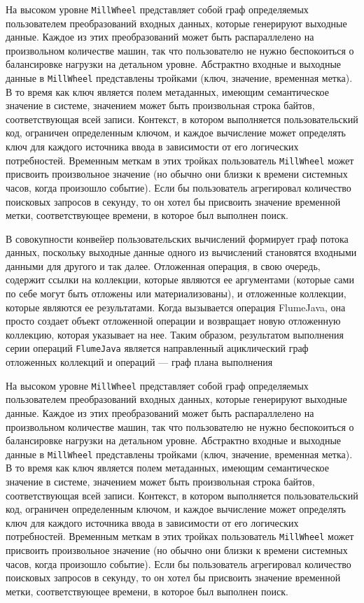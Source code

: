 На высоком уровне \texttt{MillWheel} представляет собой граф определяемых пользователем преобразований входных данных, которые генерируют выходные данные. Каждое из этих преобразований может быть распараллелено на произвольном количестве машин, так что пользователю не нужно беспокоиться о балансировке нагрузки на детальном уровне. Абстрактно входные и выходные данные в \texttt{MillWheel} представлены тройками (ключ, значение, временная метка). 
В то время как ключ является полем метаданных, имеющим семантическое значение в системе, значением может быть произвольная строка байтов, соответствующая всей записи. 
Контекст, в котором выполняется пользовательский код, ограничен определенным ключом, и каждое вычисление может определять ключ для каждого источника ввода в зависимости от его логических потребностей. 
Временным меткам в этих тройках пользователь \texttt{MillWheel} может присвоить произвольное значение (но обычно они близки к времени системных часов, когда произошло событие). Если бы пользователь агрегировал количество поисковых запросов в секунду, то он хотел бы присвоить значение временной метки, соответствующее времени, в которое был выполнен поиск.

В совокупности конвейер пользовательских вычислений формирует граф потока данных, поскольку выходные данные одного из вычислений становятся входными данными для другого и так далее.
Отложенная операция, в свою очередь, содержит ссылки на коллекции, которые являются ее аргументами (которые сами по себе могут быть отложены или материализованы), и отложенные коллекции, которые являются ее результатами. Когда вызывается операция FlumeJava, она просто создает объект отложенной операции и возвращает новую отложенную коллекцию, которая указывает на нее. 
Таким образом, результатом выполнения серии операций \texttt{FlumeJava} является направленный ациклический граф отложенных коллекций и операций --- граф плана выполнения

На высоком уровне \texttt{MillWheel} представляет собой граф определяемых пользователем преобразований входных данных, которые генерируют выходные данные. Каждое из этих преобразований может быть распараллелено на произвольном количестве машин, так что пользователю не нужно беспокоиться о балансировке нагрузки на детальном уровне. Абстрактно входные и выходные данные в \texttt{MillWheel} представлены тройками (ключ, значение, временная метка). 
В то время как ключ является полем метаданных, имеющим семантическое значение в системе, значением может быть произвольная строка байтов, соответствующая всей записи. 
Контекст, в котором выполняется пользовательский код, ограничен определенным ключом, и каждое вычисление может определять ключ для каждого источника ввода в зависимости от его логических потребностей. 
Временным меткам в этих тройках пользователь \texttt{MillWheel} может присвоить произвольное значение (но обычно они близки к времени системных часов, когда произошло событие). Если бы пользователь агрегировал количество поисковых запросов в секунду, то он хотел бы присвоить значение временной метки, соответствующее времени, в которое был выполнен поиск.


